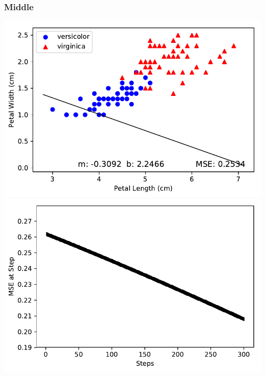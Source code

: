 \documentclass[letterpaper]{article}
\begin{document}
\subsubsection{Middle}
\begin{center}
\includegraphics{plot_3c_3.pdf}
\includegraphics{plot_3c_4.pdf}
\end{center}
\end{document}
